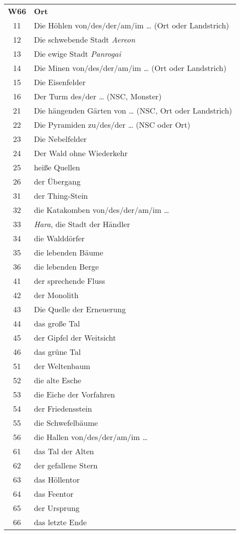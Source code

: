 \documentclass[11pt]{wbzine}
\begin{document}
\begin{tabularx}{\columnwidth}{cZ}
\textbf{W66} & \textbf{Ort} \\
11 & Die Höhlen von/des/der/am/im \ldots{} (Ort oder
Landstrich)\\
12 & Die schwebende Stadt \emph{Aereon}\\
13 & Die ewige Stadt \emph{Panrogai}\\
14 & Die Minen von/des/der/am/im \ldots{} (Ort oder
Landstrich)\\
15 & Die Eisenfelder\\
16 & Der Turm des/der \ldots{} (NSC, Monster)\\
21 & Die hängenden Gärten von \ldots{} (NSC, Ort oder
Landstrich)\\
22 & Die Pyramiden zu/des/der \ldots{} (NSC oder Ort)\\
23 & Die Nebelfelder\\
24 & Der Wald ohne Wiederkehr\\
25 & heiße Quellen\\
26 & der Übergang\\
31 & der Thing-Stein\\
32 & die Katakomben von/des/der/am/im \ldots{}\\
33 & \emph{Hara}, die Stadt der Händler\\
34 & die Walddörfer\\
35 & die lebenden Bäume\\
36 & die lebenden Berge\\
41 & der sprechende Fluss\\
42 & der Monolith\\
43 & Die Quelle der Erneuerung\\
44 & das große Tal\\
45 & der Gipfel der Weitsicht\\
46 & das grüne Tal\\
51 & der Weltenbaum\\
52 & die alte Esche\\
53 & die Eiche der Vorfahren\\
54 & der Friedensstein\\
55 & die Schwefelbäume\\
56 & die Hallen von/des/der/am/im \ldots{}\\
61 & das Tal der Alten\\
62 & der gefallene Stern\\
63 & das Höllentor\\
64 & das Feentor\\
65 & der Ursprung\\
66 & das letzte Ende\\
\end{tabularx}
\end{document}
